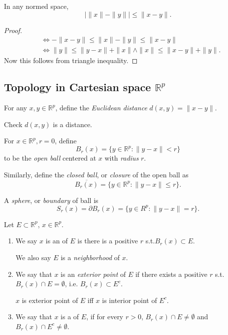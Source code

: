 
\begin{proposition}
	In any normed space, \[
		|\|x\|-\|y\| |  \le \|x-y\|
	.\] 
\end{proposition}
\begin{proof}
	\begin{align*}
		&\iff -\|x-y\|\le \|x\| - \|y\| \le  \|x-y\| \\
		&\iff \|y\|\le \|y-x\| + \|x\| \land \|x\| \le  \|x-y\| + \|y\|
	.\end{align*}
	Now this follows from triangle inequality.
\end{proof}


\subsection{Topology in Cartesian space $\mathbb{R}^p$ }

For any $x,y \in \mathbb{R}^p$, define the \textit{Euclidean distance} $d(x,y) = \|x-y\|$.

Check $d(x,y)$ is a distance.

\begin{definition}
	For $x \in \mathbb{R}^p, r = 0$, define \[
		B_r(x) = \{y \in \mathbb{R}^p: \|y-x\|< r\} 
	\] to be the \textit{open ball} centered at $x$ with \textit{radius} $r$.

	Similarly, define the \textit{closed ball}, or \textit{closure} of the open ball as \[
		\overline{B_r(x)} = \{y \in \mathbb{R}^p: \|y-x\|\le r\} 
	.\] 

	A \textit{sphere}, or \textit{boundary} of ball is \[
		S_r(x) = \partial B_r (x) = \{y \in R^{p}: \|y-x\|= r\} 
	.\] 
\end{definition}


\begin{definition}
	Let $E \subset \mathbb{R}^p$, $x \in \mathbb{R}^p$. 
	\begin{enumerate}
		\item We say $x$ is an  of $E$ is there is a positive $r$ s.t.$B_r(x) \subset E$.

			We also say $E$ is a \textit{neighborhood} of $x$.
		\item We say that $x$ is an \textit{exterior point} of $E$ if there exists a positive $r$ s.t. $B_r(x) \cap E =\emptyset $, i.e. $B_r(x) \subset E^c$.

		$x$ is exterior point of $E$ iff $x$ is interior point of $E^c$.
	\item We say that $x$ is a  of $E$, if for every $r > 0$, $B_r(x) \cap E\neq \emptyset $ and $B_r(x)\cap E^c \neq \emptyset $.
	\end{enumerate}
\end{definition}

